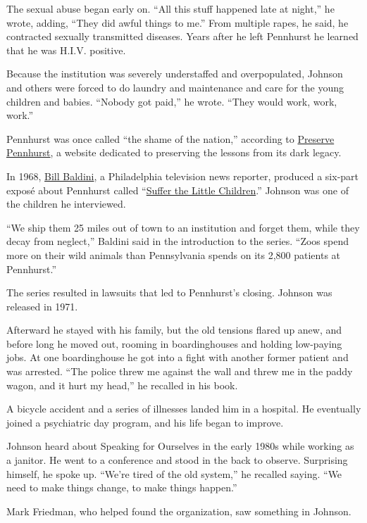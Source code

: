 The sexual abuse began early on. ``All this stuff happened late at
night,'' he wrote, adding, ``They did awful things to me.'' From
multiple rapes, he said, he contracted sexually transmitted diseases.
Years after he left Pennhurst he learned that he was H.I.V. positive.

Because the institution was severely understaffed and overpopulated,
Johnson and others were forced to do laundry and maintenance and care
for the young children and babies. ``Nobody got paid,'' he wrote. ``They
would work, work, work.''

Pennhurst was once called ``the shame of the nation,'' according to
\href{http://www.preservepennhurst.org/}{Preserve Pennhurst}, a website
dedicated to preserving the lessons from its dark legacy.

In 1968, \href{https://www.broadcastpioneers.com/billbaldini.html}{Bill
Baldini}, a Philadelphia television news reporter, produced a six-part
exposé about Pennhurst called
``\href{http://www.preservepennhurst.org/default.aspx?pg=26}{Suffer the
Little Children}.'' Johnson was one of the children he interviewed.

``We ship them 25 miles out of town to an institution and forget them,
while they decay from neglect,'' Baldini said in the introduction to the
series. ``Zoos spend more on their wild animals than Pennsylvania spends
on its 2,800 patients at Pennhurst.''

The series resulted in lawsuits that led to Pennhurst's closing. Johnson
was released in 1971.

Afterward he stayed with his family, but the old tensions flared up
anew, and before long he moved out, rooming in boardinghouses and
holding low-paying jobs. At one boardinghouse he got into a fight with
another former patient and was arrested. ``The police threw me against
the wall and threw me in the paddy wagon, and it hurt my head,'' he
recalled in his book.

A bicycle accident and a series of illnesses landed him in a hospital.
He eventually joined a psychiatric day program, and his life began to
improve.

Johnson heard about Speaking for Ourselves in the early 1980s while
working as a janitor. He went to a conference and stood in the back to
observe. Surprising himself, he spoke up. ``We're tired of the old
system,'' he recalled saying. ``We need to make things change, to make
things happen.''

Mark Friedman, who helped found the organization, saw something in
Johnson.

